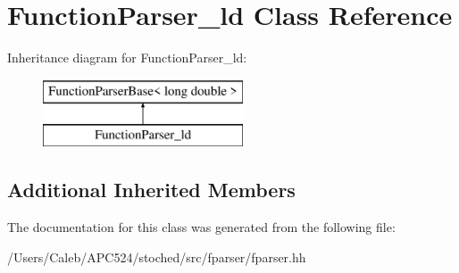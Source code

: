 \hypertarget{class_function_parser__ld}{}\section{Function\+Parser\+\_\+ld Class Reference}
\label{class_function_parser__ld}
Inheritance diagram for Function\+Parser\+\_\+ld\+:\begin{figure}[H]
\begin{center}
\leavevmode
\includegraphics[height=2.000000cm]{class_function_parser__ld}
\end{center}
\end{figure}
\subsection*{Additional Inherited Members}


The documentation for this class was generated from the following file\+:\begin{DoxyCompactItemize}
\item 
/\+Users/\+Caleb/\+A\+P\+C524/stoched/src/fparser/fparser.\+hh\end{DoxyCompactItemize}
